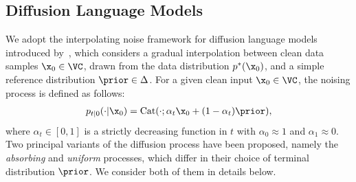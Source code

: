     \subsection{Diffusion Language Models}
    \label{sec:discrete diffusion models}        
        We adopt the interpolating noise framework for diffusion language models introduced by~\citep{sahoo2024simple, sahoo2025the}, which considers a gradual interpolation between clean data samples $\x_0 \in \VC$, drawn from the data distribution $p^*(\x_0)$, and a simple reference distribution $\prior \in \Delta$. For a given clean input $\x_0 \in \VC$, the noising process is defined as follows:
        \begin{gather}
            p_{t|0}(\cdot|\x_0) = \text{Cat}(\cdot; \alpha_{t} \x_0 + (1-\alpha_{t})\prior),
        \end{gather}
        where $\alpha_{t} \in [0,1]$ is a strictly decreasing function in $t$ with $\alpha_0 \approx 1$ and $\alpha_1 \approx 0$. 
        Two principal variants of the diffusion process have been proposed, namely the \emph{absorbing} and \emph{uniform} processes, which differ in their choice of terminal distribution $\prior$. We consider both of them in details below.
        
